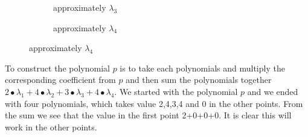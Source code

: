 \begin{figure}[H]
    \centering
    \captionsetup[subfigure]{labelformat=empty}
    \begin{subfigure}[b]{0.3\textwidth}
        \caption{approximately $\lambda_3$}
    \end{subfigure}
    \qquad %
    \qquad %
    \qquad %
    \qquad %
    \begin{subfigure}[b]{0.3\textwidth}
        \caption{approximately $\lambda_4$}
    \end{subfigure}
\end{figure}

\noindent
To construct the polynomial \begin{math}p\end{math} is to take each polynomials and multiply the corresponding coefficient from \begin{math}p\end{math} and then sum the polynomials together \begin{math}2∙\lambda_1+4∙\lambda_2+3∙\lambda_3+4∙\lambda_4 \end{math}. We started with the polynomial $p$ and we ended with four polynomials, which takes value 2,4,3,4 and 0 in the other points. From the sum we see that the value in the first point 2+0+0+0. It is clear this will work in the other points. 

